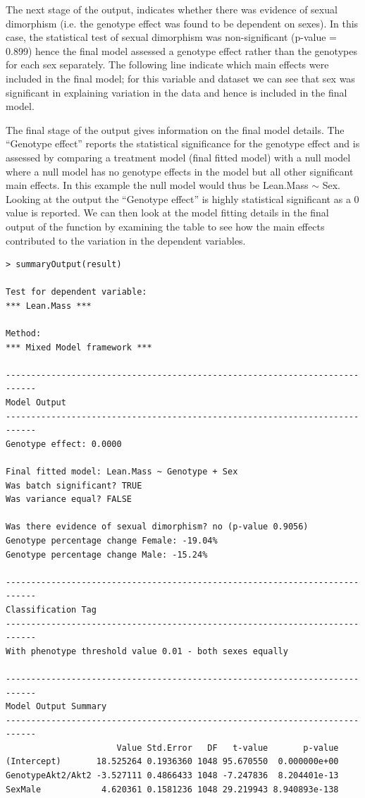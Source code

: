 \documentclass[12pt,a4paper]{article}
\begin{document}
The next stage of the output, indicates whether there was evidence of sexual dimorphism (i.e. the genotype effect was found to be dependent on sexes).  
In this case, the statistical test of sexual dimorphism was non-significant (p-value = 0.899) hence the final model assessed a genotype effect rather than the genotypes for each sex separately.  
The following line indicate which main effects were included in the final model; 
for this variable and dataset we can see that sex was significant in explaining variation in the data and hence is included in the final model. 

The final stage of the output gives information on the final model details.  
The “Genotype effect” reports the statistical significance for the genotype effect and is assessed by comparing a treatment model (final fitted model) with a null model where a null model 
has no genotype effects in the model but all other significant main effects.  
In this example the null model would thus be Lean.Mass $\sim$ Sex. Looking at the output the “Genotype effect” is highly statistical significant as a 0 value is reported.  
We can then look at the model fitting details in the final output of the function by examining the table to see how the main effects contributed to the variation in the dependent variables. 

\begingroup
    \fontsize{8pt}{12pt}\selectfont
\begin{verbatim}
> summaryOutput(result)

Test for dependent variable:
*** Lean.Mass ***

Method:
*** Mixed Model framework ***

----------------------------------------------------------------------------
Model Output
----------------------------------------------------------------------------
Genotype effect: 0.0000

Final fitted model: Lean.Mass ~ Genotype + Sex
Was batch significant? TRUE
Was variance equal? FALSE

Was there evidence of sexual dimorphism? no (p-value 0.9056)
Genotype percentage change Female: -19.04%
Genotype percentage change Male: -15.24%

----------------------------------------------------------------------------
Classification Tag
----------------------------------------------------------------------------
With phenotype threshold value 0.01 - both sexes equally

----------------------------------------------------------------------------
Model Output Summary
----------------------------------------------------------------------------
                      Value Std.Error   DF   t-value       p-value
(Intercept)       18.525264 0.1936360 1048 95.670550  0.000000e+00
GenotypeAkt2/Akt2 -3.527111 0.4866433 1048 -7.247836  8.204401e-13
SexMale            4.620361 0.1581236 1048 29.219943 8.940893e-138
\end{verbatim}
\endgroup 
\end{document}
